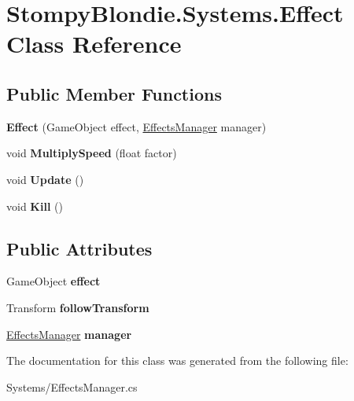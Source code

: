 \hypertarget{class_stompy_blondie_1_1_systems_1_1_effect}{}\section{Stompy\+Blondie.\+Systems.\+Effect Class Reference}
\label{class_stompy_blondie_1_1_systems_1_1_effect}
\subsection*{Public Member Functions}
\begin{DoxyCompactItemize}
\item 
\mbox{\label{class_stompy_blondie_1_1_systems_1_1_effect_af69895e2de62f92bd139e41305ee99a8}} 
{\bfseries Effect} (Game\+Object effect, \mbox{\hyperlink{class_stompy_blondie_1_1_systems_1_1_effects_manager}{Effects\+Manager}} manager)
\item 
\mbox{\label{class_stompy_blondie_1_1_systems_1_1_effect_adb4d706c6819eaae1ef1459e60032ff4}} 
void {\bfseries Multiply\+Speed} (float factor)
\item 
\mbox{\label{class_stompy_blondie_1_1_systems_1_1_effect_a38e13bfc780bf28b651e22f5a2621031}} 
void {\bfseries Update} ()
\item 
\mbox{\label{class_stompy_blondie_1_1_systems_1_1_effect_a23499c024421bfeeb3996d2efd026641}} 
void {\bfseries Kill} ()
\end{DoxyCompactItemize}
\subsection*{Public Attributes}
\begin{DoxyCompactItemize}
\item 
\mbox{\label{class_stompy_blondie_1_1_systems_1_1_effect_ab5c9c40c7a8df170f1ac8a631dde8e76}} 
Game\+Object {\bfseries effect}
\item 
\mbox{\label{class_stompy_blondie_1_1_systems_1_1_effect_ad3eb7a90a28a4fbe361214890cdb06b4}} 
Transform {\bfseries follow\+Transform}
\item 
\mbox{\label{class_stompy_blondie_1_1_systems_1_1_effect_a06ce39c8c8192912d9e94a3d337afd4e}} 
\mbox{\hyperlink{class_stompy_blondie_1_1_systems_1_1_effects_manager}{Effects\+Manager}} {\bfseries manager}
\end{DoxyCompactItemize}


The documentation for this class was generated from the following file\+:\begin{DoxyCompactItemize}
\item 
Systems/Effects\+Manager.\+cs\end{DoxyCompactItemize}
